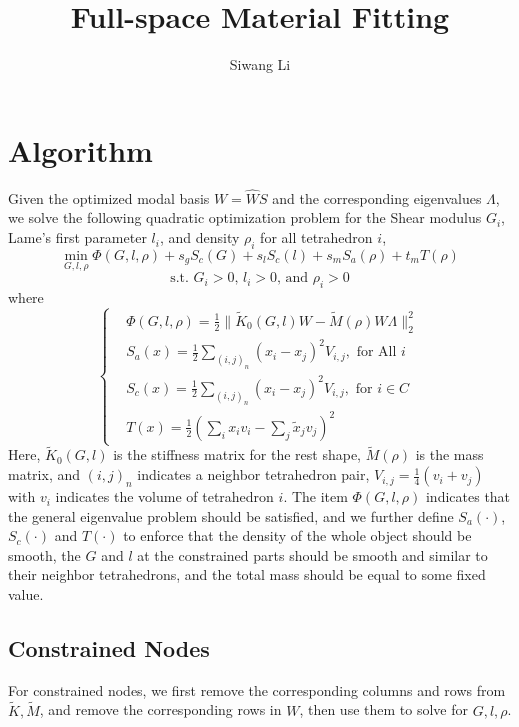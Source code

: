 \documentclass[9pt,twocolumn]{extarticle}
\author{Siwang Li}
\title{Full-space Material Fitting}
\begin{document}
\maketitle

\setlength{\parskip}{0.5ex}

\section{Algorithm}
Given the optimized modal basis $W=\hat{W}S$ and the corresponding eigenvalues
$\Lambda$, we solve the following quadratic optimization problem for the Shear
modulus $G_i$, Lame's first parameter $l_i$, and density $\rho_i$ for all
tetrahedron $i$,
\begin{equation} \label{opt}
  \min_{G,l,\rho} \Phi(G,l,\rho)+s_gS_c(G)+s_lS_c(l)+s_mS_a(\rho)+t_mT(\rho)
\end{equation}
\[
  \mbox{s.t. }  G_i>0 \mbox{, } l_i>0 \mbox{, and } \rho_i>0  
\]
where
\begin{equation*}
  \left\{ \begin{array}{rl}
      &\Phi(G,l,\rho) = \frac{1}{2}\|\tilde{K}_0(G,l)W-\tilde{M}(\rho)W\Lambda\|_2^2\\
      &S_a(x) = \frac{1}{2}\sum_{(i,j)_{n}}(x_i-x_j)^2V_{i,j}, \mbox{ for All }i\\
      &S_c(x) = \frac{1}{2}\sum_{(i,j)_{n}}(x_i-x_j)^2V_{i,j}, \mbox{ for } i\in C\\
      &T(x) = \frac{1}{2}(\sum_{i}x_iv_{i}-\sum_{j}\tilde{x}_jv_{j})^2
    \end{array} \right.
\end{equation*}
Here, $\tilde{K}_0(G,l)$ is the stiffness matrix for the rest shape,
$\tilde{M}(\rho)$ is the mass matrix, and $(i,j)_{n}$ indicates a neighbor
tetrahedron pair, $V_{i,j}=\frac{1}{4}(v_i+v_j)$ with $v_i$ indicates the volume
of tetrahedron $i$. The item $\Phi(G,l,\rho)$ indicates that the general
eigenvalue problem should be satisfied, and we further define $S_a(\cdot)$,
$S_c(\cdot)$ and $T(\cdot)$ to enforce that the density of the whole object
should be smooth, the $G$ and $l$ at the constrained parts should be smooth and
similar to their neighbor tetrahedrons, and the total mass should be equal to
some fixed value.

\subsection{Constrained Nodes}
For constrained nodes, we first remove the corresponding columns and rows from
$\tilde{K}, \tilde{M}$, and remove the corresponding rows in $W$, then use them
to solve for $G,l,\rho$.
\end{document}
